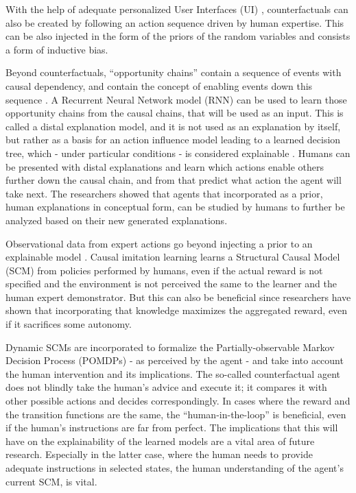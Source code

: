 \documentclass[twoside,11pt]{article}
\begin{document}

With the help of adequate personalized User Interfaces (UI) \cite{Sun:2021:TopologyPerturbationGNNs}, counterfactuals can also be created by following an action sequence driven by human expertise. This can be also injected in the form of the priors of the random variables and consists a form of inductive bias.

Beyond counterfactuals, ``opportunity chains'' contain a sequence of events with causal dependency, and contain the concept of enabling events down this sequence \cite{Madumal:2020:DistalEF}. A Recurrent Neural Network model (RNN) \cite{Hochreiter:1997:Lstm} can be used to learn those opportunity chains from the causal chains, that will be used as an input. This is called a distal explanation model, and it is not used as an explanation by itself, but rather as a basis for an action influence model leading to a learned decision tree, which - under particular conditions - is considered explainable \cite{Jung:2020:ExplainableEmpiricalRiskMinimization}. Humans can be presented with distal explanations and learn which actions enable others further down the causal chain, and from that predict what action the agent will take next. The researchers showed that agents that incorporated as a prior, human explanations in conceptual form, can be studied by humans to further be analyzed based on their new generated explanations.

Observational data from expert actions go beyond injecting a prior to an explainable model \cite{Zhang:2020:CausalImitationLearning}. Causal imitation learning learns a Structural Causal Model (SCM) \cite{Pearl:2000:ModelsReasoningInference} from policies performed by humans, even if the actual reward is not specified and the environment is not perceived the same to the learner and the human expert demonstrator. But this can also be beneficial since researchers have shown that incorporating that knowledge maximizes the aggregated reward, even if it sacrifices some autonomy. 

Dynamic SCMs are incorporated to formalize the Partially-observable Markov Decision Process (POMDPs) \cite{SuttonBarto:2018:RLIntroduction} - as perceived by the agent - and take into account the human intervention and its implications. The so-called counterfactual agent does not blindly take the human's advice and execute it; it compares it with other possible actions and decides correspondingly. In cases where the reward and the transition functions are the same, the ``human-in-the-loop'' is beneficial, even if the human's instructions are far from perfect. The implications that this will have on the explainability of the learned models are a vital area of future research. Especially in the latter case, where the human needs to provide adequate instructions in selected states, the human understanding of the agent's current SCM, is vital.  
\end{document}
